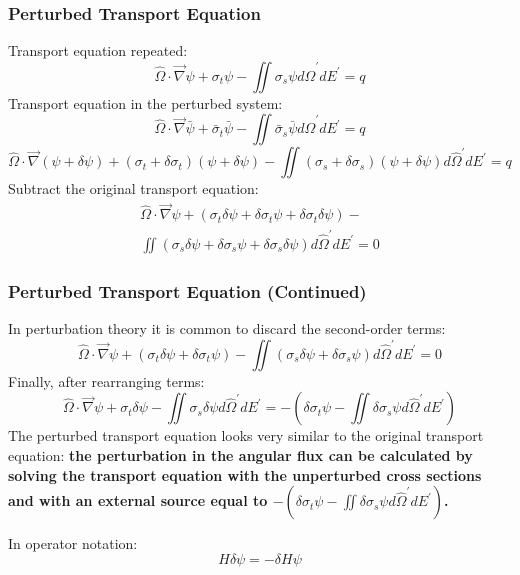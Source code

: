 \documentclass[t]{beamer}
\begin{document}
\begin{frame}
  \frametitle{Perturbed Transport Equation}
  Transport equation repeated:
  \begin{equation*}
    \hat{\Omega}\cdot\vec{\nabla}\psi +
    \sigma_t\psi -
    \iint\sigma_s\psi d\hat{\Omega}^\prime dE^\prime =
    q
  \end{equation*}
  Transport equation in the perturbed system:
  \begin{equation}
    \hat{\Omega}\cdot\vec{\nabla}\bar{\psi} +
    \bar{\sigma}_t\bar{\psi} -
    \iint\bar{\sigma}_s\bar{\psi} d\hat{\Omega}^\prime dE^\prime =
    q
  \end{equation}
  \begin{equation}
    \hat{\Omega}\cdot\vec{\nabla}\left(\psi + \delta\psi\right) +
    \left(\sigma_t + \delta\sigma_t\right)\left(\psi + \delta\psi\right) -
    \iint\left(\sigma_s + \delta\sigma_s\right)\left(\psi + \delta\psi\right)d\hat{\Omega}^\prime dE^\prime =
    q
  \end{equation}
  Subtract the original transport equation:
  \begin{multline}
    \hat{\Omega}\cdot\vec{\nabla}\psi +
    \left(\sigma_t\delta\psi + \delta\sigma_t\psi + \delta\sigma_t\delta\psi\right) - \\
    \iint\left(\sigma_s\delta\psi + \delta\sigma_s\psi + \delta\sigma_s\delta\psi\right)d\hat{\Omega}^\prime dE^\prime =
    0
  \end{multline}
\end{frame}

\begin{frame}
  \frametitle{Perturbed Transport Equation (Continued)}
  In perturbation theory it is common to discard the second-order terms:
  \begin{equation}
    \hat{\Omega}\cdot\vec{\nabla}\psi +
    \left(\sigma_t\delta\psi + \delta\sigma_t\psi\right) -
    \iint\left(\sigma_s\delta\psi + \delta\sigma_s\psi\right)d\hat{\Omega}^\prime dE^\prime =
    0
  \end{equation}
  Finally, after rearranging terms:
  \begin{equation}
    \hat{\Omega}\cdot\vec{\nabla}\psi +
    \sigma_t\delta\psi -
    \iint\sigma_s\delta\psi d\hat{\Omega}^\prime dE^\prime =
    -\left(\delta\sigma_t\psi - \iint\delta\sigma_s\psi d\hat{\Omega}^\prime dE^\prime\right)
  \end{equation}
  The perturbed transport equation looks very similar to the original transport
  equation: \textbf{the perturbation in the angular flux can be calculated by
  solving the transport equation with the unperturbed cross sections and with an
  external source equal to
  $-\left(\delta\sigma_t\psi - \iint\delta\sigma_s\psi d\hat{\Omega}^\prime dE^\prime\right)$.}

  In operator notation:
  \begin{equation}
    H\delta\psi = -\delta H\psi
  \end{equation}
\end{frame}
\end{document}
